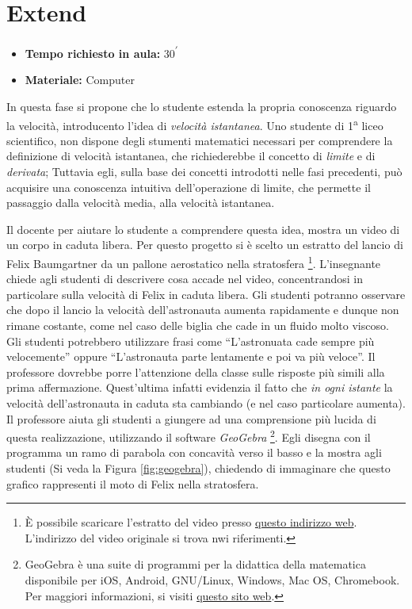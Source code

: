 \documentclass{report} \usepackage[T1]{fontenc} \usepackage[italian]{babel}
\begin{document}
\section{Extend}

\begin{itemize}
\item \textbf{Tempo richiesto in aula:} 30\textsuperscript{$\prime$}
\item \textbf{Materiale:} Computer
\end{itemize}

In questa fase si propone che lo studente estenda la propria conoscenza
riguardo la velocità, introducento l'idea di \emph{velocità istantanea}.
Uno studente di 1\textsuperscript{a} liceo scientifico, non dispone
degli stumenti matematici necessari per comprendere la definizione
di velocità istantanea, che richiederebbe il concetto
di \emph{limite} e di \emph{derivata}; Tuttavia egli, sulla base
dei concetti introdotti nelle fasi precedenti, può acquisire
una conoscenza intuitiva dell'operazione di limite, che permette
il passaggio dalla velocità media, alla velocità istantanea.

Il docente per aiutare lo studente a comprendere questa idea,
mostra un video di un corpo in caduta libera. Per questo progetto
si è scelto un estratto del lancio di Felix Baumgartner da un
pallone aerostatico nella stratosfera
\footnote{
          \`E possibile scaricare l'estratto del video presso
          \href{https://github.com/savaroskij/PED1/blob/master/progetto_finale/media/video/felix_baumgartner.mp4?raw=true}{questo indirizzo web}.
          L'indirizzo del video originale si trova nwi riferimenti\cite{felix}.
         }.
L'insegnante chiede agli studenti di descrivere cosa accade nel
video, concentrandosi in particolare sulla velocità di Felix in caduta
libera. Gli studenti potranno osservare che dopo il lancio la velocità
dell'astronauta aumenta rapidamente e dunque non rimane costante, come nel
caso delle biglia che cade in un fluido molto viscoso.
Gli studenti potrebbero utilizzare frasi come ``L'astronuata cade
sempre più velocemente'' oppure ``L'astronauta parte
lentamente e poi va più veloce''.
Il professore dovrebbe porre l'attenzione della classe sulle
risposte più simili alla prima affermazione. Quest'ultima
infatti evidenzia il fatto che \emph{in ogni istante} la velocità
dell'astronauta in caduta sta cambiando (e nel caso particolare aumenta).
Il professore aiuta gli studenti a giungere ad una comprensione
più lucida di questa realizzazione, utilizzando il software
\emph{GeoGebra}
\footnote{
          GeoGebra è una suite di programmi per la didattica della matematica
          disponibile per iOS, Android, GNU/Linux, Windows, Mac OS, Chromebook.
          Per maggiori informazioni, si visiti
          \href{https://www.geogebra.org/}{questo sito web}.
         }.
Egli disegna con il programma un ramo di parabola con concavità
verso il basso e la mostra agli studenti (Si veda la Figura
\ref{fig:geogebra}), chiedendo di immaginare che questo grafico
rappresenti il moto di Felix nella stratosfera.
\end{document}
